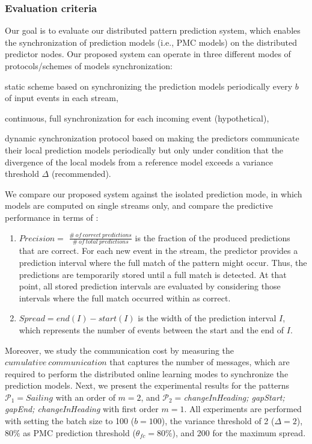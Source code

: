 \subsubsection*{Evaluation criteria} Our goal is to evaluate our distributed pattern prediction system, which enables the synchronization of prediction models (i.e., PMC models) on the distributed predictor nodes. Our proposed system can operate in three different modes of  protocols/schemes of models synchronization: \begin{enumerate*}[label=(\roman*)] 
	\item static scheme based on synchronizing the prediction models periodically every $b$ of input events in each stream, 
\item continuous, full synchronization for each incoming event (hypothetical), 
\item dynamic synchronization protocol based on making the predictors communicate their local prediction models periodically but only under condition that the divergence of the local models from a reference model exceeds a variance threshold $\Delta$ (recommended).  	   

\end{enumerate*}
\par We compare our proposed system against the isolated prediction mode, in which models are computed on single streams only, and compare the predictive performance in terms of :
\begin{enumerate}[label=(\roman*)]
	
\item  $\mathit{Precision} =$ $ \mathit{\frac{\#\ of\ correct\ predictions}{\#\ of\ total\ predictions}}$ is the fraction of the produced predictions that are correct. For each new event in the stream, the predictor provides a prediction interval where the full match of the pattern might occur. Thus, the predictions are temporarily stored until a full match is detected. At that point, all stored prediction intervals are evaluated by considering those intervals where the full match occurred within as correct.     

\item $\mathit{Spread}$$ =end(I) -start(I)$ is the width of the prediction interval $I$, which represents the number of events between the start and the end of $I$. 

\end{enumerate} 
\par Moreover, we study the communication cost by measuring the $\mathit{cumulative\ communication}$ that captures the number of messages, which are required to perform the distributed online learning modes to synchronize the prediction models. Next, we present the experimental results for the patterns  $\mathcal{P}_1=Sailing$ with an order of $m=2$, and   $\mathcal{P}_2=$\textit{changeInHeading; gapStart; gapEnd; changeInHeading} with first order $m=1$. All experiments are performed with setting the batch size to 100  ($b=100$), the variance threshold of 2 ($\Delta=2$), $80\%$ as PMC prediction threshold ($\theta_{fc}=80\%$), and 200 for the maximum spread.

